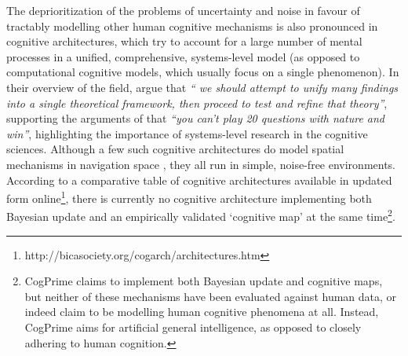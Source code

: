The deprioritization of the problems of uncertainty and noise in favour of tractably modelling other human cognitive mechanisms is also pronounced in cognitive architectures, which try to account for a large number of mental processes in a unified, comprehensive, systems-level model (as opposed to computational cognitive models, which usually focus on a single phenomenon). In their overview of the field, \cite{langley2009cognitive} argue that \textit{`` we should attempt to unify many findings into a single theoretical framework, then proceed to test and refine that theory''}, supporting the arguments of \cite{newell1973you} that \textit{``you can't play 20 questions with nature and win''}, highlighting the importance of systems-level research in the cognitive sciences. Although a few such cognitive architectures do model spatial mechanisms in navigation space \citep{harrison2003act,schultheis2011casimir,sun2004top}, they all run in simple, noise-free environments. According to a comparative table of cognitive architectures \citep{samsonovich2011comparative} available in updated form online\footnote{http://bicasociety.org/cogarch/architectures.htm}, there is currently no cognitive architecture implementing both Bayesian update and an empirically validated `cognitive map' at the same time\footnote{CogPrime \citep{goertzel2013cogprime} claims to implement both Bayesian update and cognitive maps, but neither of these mechanisms have been evaluated against human data, or indeed claim to be modelling human cognitive phenomena at all. Instead, CogPrime aims for artificial general intelligence, as opposed to closely adhering to human cognition.}.

